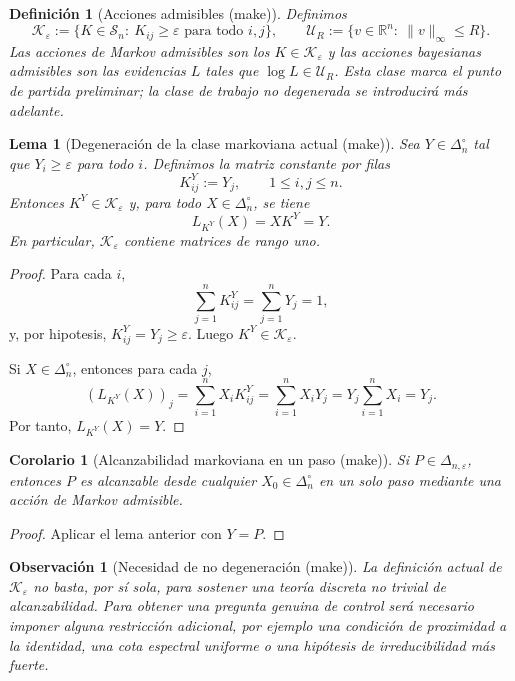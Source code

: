 ﻿\documentclass[12pt]{article}
\newcommand{\fuente}[1]{\textnormal{(#1)}}
\newtheorem{definicion}{Definición}[section]
\newtheorem{lema}{Lema}[section]
\newtheorem{corolario}{Corolario}[section]
\newtheorem{observacion}{Observación}[section]
\begin{document}
\begin{definicion}[Acciones admisibles \fuente{make}]
Definimos
\[
\mathcal K_\varepsilon:=\bigl\{K\in\mathcal S_n:\ K_{ij}\ge \varepsilon\text{ para todo }i,j\bigr\},
\qquad
\mathcal U_R:=\bigl\{v\in\mathbb R^n:\ \|v\|_\infty\le R\bigr\}.
\]
Las acciones de Markov admisibles son los \(K\in\mathcal K_\varepsilon\) y las acciones bayesianas admisibles son las evidencias \(L\) tales que \(\log L\in\mathcal U_R\). Esta clase marca el punto de partida preliminar; la clase de trabajo no degenerada se introducirá más adelante.
\end{definicion}

\begin{lema}[Degeneración de la clase markoviana actual \fuente{make}]
Sea \(Y\in \Delta_n^\circ\) tal que \(Y_i\ge \varepsilon\) para todo \(i\). Definimos la matriz constante por filas
\[
K^Y_{ij}:=Y_j,\qquad 1\le i,j\le n.
\]
Entonces \(K^Y\in \mathcal K_\varepsilon\) y, para todo \(X\in\Delta_n^\circ\), se tiene
\[
L_{K^Y}(X)=XK^Y=Y.
\]
En particular, \(\mathcal K_\varepsilon\) contiene matrices de rango uno.
\end{lema}
\begin{proof}
Para cada \(i\),
\[
\sum_{j=1}^n K^Y_{ij}=\sum_{j=1}^n Y_j=1,
\]
y, por hipotesis, \(K^Y_{ij}=Y_j\ge \varepsilon\). Luego \(K^Y\in\mathcal K_\varepsilon\).

Si \(X\in\Delta_n^\circ\), entonces para cada \(j\),
\[
(L_{K^Y}(X))_j
=
\sum_{i=1}^n X_iK^Y_{ij}
=
\sum_{i=1}^n X_iY_j
=
Y_j\sum_{i=1}^n X_i
=
Y_j.
\]
Por tanto, \(L_{K^Y}(X)=Y\).
\end{proof}

\begin{corolario}[Alcanzabilidad markoviana en un paso \fuente{make}]
Si \(P\in\Delta_{n,\varepsilon}\), entonces \(P\) es alcanzable desde cualquier \(X_0\in\Delta_n^\circ\) en un solo paso mediante una acción de Markov admisible.
\end{corolario}
\begin{proof}
Aplicar el lema anterior con \(Y=P\).
\end{proof}

\begin{observacion}[Necesidad de no degeneración \fuente{make}]
La definición actual de \(\mathcal K_\varepsilon\) no basta, por sí sola, para sostener una teoría discreta no trivial de alcanzabilidad. Para obtener una pregunta genuina de control será necesario imponer alguna restricción adicional, por ejemplo una condición de proximidad a la identidad, una cota espectral uniforme o una hipótesis de irreducibilidad más fuerte.
\end{observacion}
\end{document}
